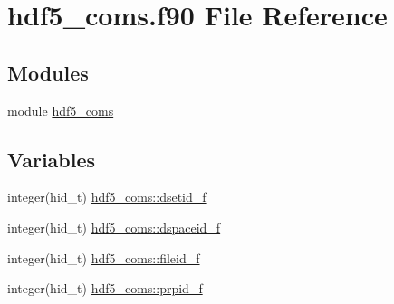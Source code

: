 \hypertarget{hdf5__coms_8f90}{}\section{hdf5\+\_\+coms.\+f90 File Reference}
\label{hdf5__coms_8f90}
\subsection*{Modules}
\begin{DoxyCompactItemize}
\item 
module \hyperlink{namespacehdf5__coms}{hdf5\+\_\+coms}
\end{DoxyCompactItemize}
\subsection*{Variables}
\begin{DoxyCompactItemize}
\item 
integer(hid\+\_\+t) \hyperlink{namespacehdf5__coms_a31611e38319474913c7422e2cf240a25}{hdf5\+\_\+coms\+::dsetid\+\_\+f}
\item 
integer(hid\+\_\+t) \hyperlink{namespacehdf5__coms_ad7b71a5a383dba57521ae99e69fe792c}{hdf5\+\_\+coms\+::dspaceid\+\_\+f}
\item 
integer(hid\+\_\+t) \hyperlink{namespacehdf5__coms_a5bdf3f7a13856c782dc68d5c2bffccb4}{hdf5\+\_\+coms\+::fileid\+\_\+f}
\item 
integer(hid\+\_\+t) \hyperlink{namespacehdf5__coms_a84009e52b52f9347b40c3e5d71cb1eb0}{hdf5\+\_\+coms\+::prpid\+\_\+f}
\end{DoxyCompactItemize}
